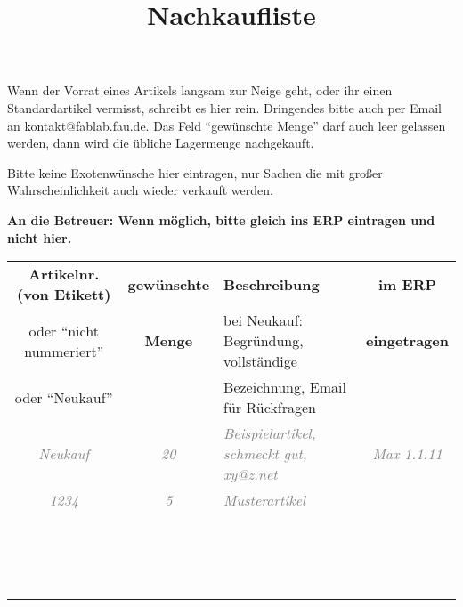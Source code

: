 \documentclass{\basedir/fablab-document}
\date{}
\author{}
\title{Nachkaufliste}
\newcommand{\thickhline}{\noalign{\hrule height 2pt}}
\begin{document}
Wenn der Vorrat eines Artikels langsam zur Neige geht, oder ihr einen Standardartikel vermisst, schreibt es hier rein. Dringendes bitte auch per Email an kontakt@fablab.fau.de. Das Feld \enquote{gewünschte Menge} darf auch leer gelassen werden, dann wird die übliche Lagermenge nachgekauft.

Bitte keine Exotenwünsche hier eintragen, nur Sachen die mit großer Wahrscheinlichkeit auch wieder verkauft werden. 

\textbf{An die Betreuer: Wenn möglich, bitte gleich ins ERP eintragen und nicht hier.}

\newcommand{\bsp}[1]{\textcolor{gray}{\it #1}}
\newcommand{\beispielzeile}[4]{\bsp{#1} & \bsp{#2} & \bsp{#3} & \bsp{#4}  \\}
\newcommand{\leerzeile}{\vbox{\vspace{2.5em}} & & & \\ \hline}
\begin{tabularx}{\textwidth}{|c|c|X|c|} \hline
\bf Artikelnr. (von Etikett)         &  \bf gewünschte  & \bf Beschreibung & \bf im ERP \\

oder \enquote{nicht nummeriert}  &  \bf Menge       & bei Neukauf: Begründung, vollständige    & \bf eingetragen \\
oder \enquote{Neukauf} & &  Bezeichnung, Email für Rückfragen & \\ \thickhline
\beispielzeile{Neukauf}{20}{Beispielartikel, schmeckt gut, xy@z.net}{Max 1.1.11} \hline
\beispielzeile{1234}{5}{Musterartikel}{} \hline
\leerzeile
\leerzeile
\leerzeile
\leerzeile
\leerzeile
\leerzeile
\leerzeile
\leerzeile
\leerzeile
\leerzeile
\leerzeile
\leerzeile
\leerzeile
\leerzeile
\leerzeile
\leerzeile
\end{tabularx}
\end{document}

